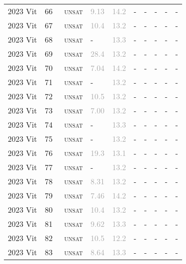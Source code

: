 \begin{center}
{\begin{longtable}{@{}llllllllll@{}}
2023 Vit & 66 & ~\textsc{unsat} & \textcolor{darkgray}{9.13} & \textcolor{darkgray}{14.2} & - & - & - & - & - \\
2023 Vit & 67 & ~\textsc{unsat} & \textcolor{darkgray}{10.4} & \textcolor{darkgray}{13.2} & - & - & - & - & - \\
2023 Vit & 68 & ~\textsc{unsat} & - & \textcolor{darkgray}{13.3} & - & - & - & - & - \\
2023 Vit & 69 & ~\textsc{unsat} & \textcolor{darkgray}{28.4} & \textcolor{darkgray}{13.2} & - & - & - & - & - \\
2023 Vit & 70 & ~\textsc{unsat} & \textcolor{darkgray}{7.04} & \textcolor{darkgray}{14.2} & - & - & - & - & - \\
2023 Vit & 71 & ~\textsc{unsat} & - & \textcolor{darkgray}{13.2} & - & - & - & - & - \\
2023 Vit & 72 & ~\textsc{unsat} & \textcolor{darkgray}{10.5} & \textcolor{darkgray}{13.2} & - & - & - & - & - \\
2023 Vit & 73 & ~\textsc{unsat} & \textcolor{darkgray}{7.00} & \textcolor{darkgray}{13.2} & - & - & - & - & - \\
2023 Vit & 74 & ~\textsc{unsat} & - & \textcolor{darkgray}{13.3} & - & - & - & - & - \\
2023 Vit & 75 & ~\textsc{unsat} & - & \textcolor{darkgray}{13.2} & - & - & - & - & - \\
2023 Vit & 76 & ~\textsc{unsat} & \textcolor{darkgray}{19.3} & \textcolor{darkgray}{13.1} & - & - & - & - & - \\
2023 Vit & 77 & ~\textsc{unsat} & - & \textcolor{darkgray}{13.2} & - & - & - & - & - \\
2023 Vit & 78 & ~\textsc{unsat} & \textcolor{darkgray}{8.31} & \textcolor{darkgray}{13.2} & - & - & - & - & - \\
2023 Vit & 79 & ~\textsc{unsat} & \textcolor{darkgray}{7.46} & \textcolor{darkgray}{14.2} & - & - & - & - & - \\
2023 Vit & 80 & ~\textsc{unsat} & \textcolor{darkgray}{10.4} & \textcolor{darkgray}{13.2} & - & - & - & - & - \\
2023 Vit & 81 & ~\textsc{unsat} & \textcolor{darkgray}{9.62} & \textcolor{darkgray}{13.3} & - & - & - & - & - \\
2023 Vit & 82 & ~\textsc{unsat} & \textcolor{darkgray}{10.5} & \textcolor{darkgray}{12.2} & - & - & - & - & - \\
2023 Vit & 83 & ~\textsc{unsat} & \textcolor{darkgray}{8.64} & \textcolor{darkgray}{13.3} & - & - & - & - & - \\

\end{longtable}}
\end{center}
